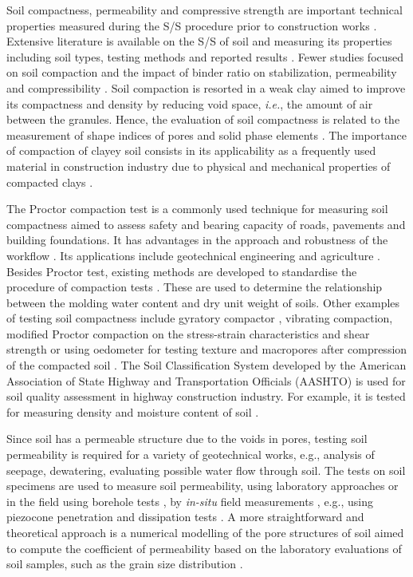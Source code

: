 \documentclass{amestyle}
\begin{document}
Soil compactness, permeability and compressive strength are important technical properties measured during the S/S procedure prior to construction works \cite{LindhWinter,XU2021114774}. Extensive literature is available on the S/S of soil and measuring its properties including soil types, testing methods and reported results \cite{Anagnostopoulos,Kallenetal2016,Lemenkov2021a,HUANG2022115452}. Fewer studies focused on soil compaction and the impact of binder ratio on stabilization, permeability and compressibility \cite{Kongkitkul,Leeetal2007}. Soil compaction is resorted in a weak clay aimed to improve its compactness and density by reducing void space, \emph{i.e.}, the amount of air between the granules. Hence, the evaluation of soil compactness is related to the measurement of shape indices of pores and solid phase elements \cite{Bryk}. The importance of compaction of clayey soil consists in its applicability as a frequently used material in construction industry due to physical and mechanical properties of compacted clays \cite{Zou}. 

The Proctor compaction test is a commonly used technique for measuring soil compactness aimed to assess safety and bearing capacity of roads, pavements and building foundations. It has advantages in the approach and robustness of the workflow \cite{Wasman,Matteo,Boudlal}. Its applications include geotechnical engineering \cite{Barden,Jibon} and agriculture \cite{ARAGON2000197,Bayat,Nhantumbo,ALAOUI20111}. Besides Proctor test, existing methods are developed to standardise the procedure of compaction tests \cite{ASTM2007,ASTM2009}. These are used to determine the relationship between the molding water content and dry unit weight of soils. Other examples of testing soil compactness include gyratory compactor \cite{Leeetal2007}, vibrating compaction, modified Proctor compaction on the stress-strain characteristics and shear strength \cite{Long} or using oedometer for testing texture and macropores after compression of the compacted soil \cite{Alaoui}. The Soil Classification System developed by the American Association of State Highway and Transportation Officials (AASHTO) is used for soil quality assessment in highway construction industry. For example, it is tested for measuring density and moisture content of soil \cite{Livneh}. 

Since soil has a permeable structure due to the voids in pores, testing soil permeability is required for a variety of geotechnical works, e.g., analysis of seepage, dewatering, evaluating possible water flow through soil. The tests on soil specimens are used to measure soil permeability, using laboratory approaches \cite{ELHAKIM20162631} or in the field using borehole tests \cite{YU2022127817}, by \emph{in-situ} field measurements \cite{ZHOU201999}, e.g., using piezocone penetration and dissipation tests \cite{TAKAI2016277,LIM2019189}. A more straightforward and theoretical approach is a numerical modelling of the pore structures of soil aimed to compute the coefficient of permeability based on the laboratory evaluations of soil samples, such as the grain size distribution \cite{LIU2021104468}.
\end{document}
